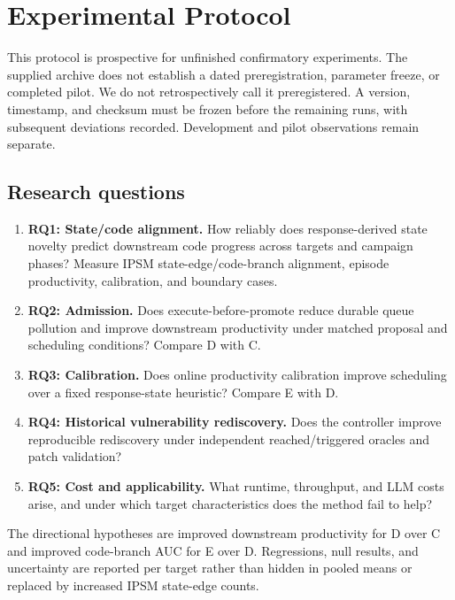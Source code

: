 \documentclass[final,5p,times,number]{elsarticle}
\begin{document}
\section{Experimental Protocol}
\label{sec:protocol}
This protocol is prospective for unfinished confirmatory experiments. The supplied archive does not establish a dated preregistration, parameter freeze, or completed pilot. We do not retrospectively call it preregistered. A version, timestamp, and checksum must be frozen before the remaining runs, with subsequent deviations recorded. Development and pilot observations remain separate.

\subsection{Research questions}
\begin{enumerate}
\item \textbf{RQ1: State/code alignment.} How reliably does response-derived state novelty predict downstream code progress across targets and campaign phases? Measure IPSM state-edge/code-branch alignment, episode productivity, calibration, and boundary cases.
\item \textbf{RQ2: Admission.} Does execute-before-promote reduce durable queue pollution and improve downstream productivity under matched proposal and scheduling conditions? Compare D with C.
\item \textbf{RQ3: Calibration.} Does online productivity calibration improve scheduling over a fixed response-state heuristic? Compare E with D.
\item \textbf{RQ4: Historical vulnerability rediscovery.} Does the controller improve reproducible rediscovery under independent reached/triggered oracles and patch validation?
\item \textbf{RQ5: Cost and applicability.} What runtime, throughput, and LLM costs arise, and under which target characteristics does the method fail to help?
\end{enumerate}
The directional hypotheses are improved downstream productivity for D over C and improved code-branch AUC for E over D. Regressions, null results, and uncertainty are reported per target rather than hidden in pooled means or replaced by increased IPSM state-edge counts.
\end{document}
